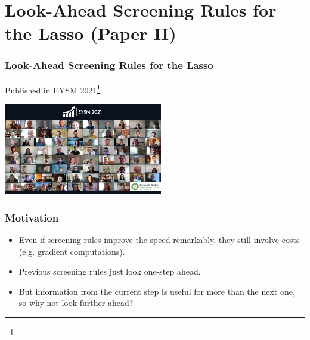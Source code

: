 \documentclass[10pt]{beamer}
\begin{document}
\section{Look-Ahead Screening Rules for the Lasso (Paper II)}

\begin{frame}[c]
  \frametitle{Look-Ahead Screening Rules for the Lasso}
  Published in EYSM 2021\footnote{}

  \bigskip

  \begin{center}
    \includegraphics[height=4cm]{figures/eysm.png}
  \end{center}

\end{frame}

\begin{frame}[c]
  \frametitle{Motivation}
  \begin{itemize}[<+->]
    \item Even if screening rules improve the speed remarkably, they still involve costs (e.g.
          gradient computations).
    \item Previous screening rules just look one-step ahead.
    \item But information from the current step is useful for more than the next one, so why not look
          further ahead?
  \end{itemize}
\end{frame}
\end{document}
